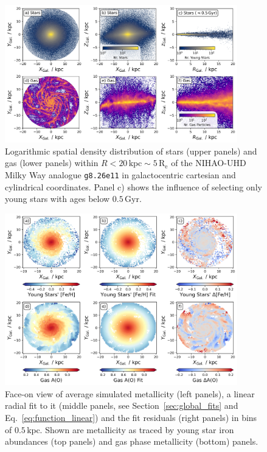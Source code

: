 \documentclass[twocolumn,apj,numberedappendix,appendixfloats,twocolappendix]{openjournal}
\newcommand{\nihaoAGEmax}{$0.5\,\mathrm{Gyr}$}
\begin{document}
\begin{CJK*}{UTF8}{gbsn}
\begin{figure}
    \centering
    \includegraphics[width=0.9\textwidth]{figures/stars_and_gas_overview.png}
    \caption{Logarithmic spatial density distribution of stars (upper panels) and gas (lower panels) within $R < 20\,\mathrm{kpc} \sim 5\,\mathrm{R_e}$ of the NIHAO-UHD Milky Way analogue \texttt{g8.26e11} in galactocentric cartesian and cylindrical coordinates. Panel c) shows the influence of selecting only young stars with ages below \nihaoAGEmax.}
    \label{fig:stars_and_gas_overview}
\end{figure}

\begin{figure}
    \centering
    \includegraphics[width=0.9\textwidth]{figures/stars_and_gas_2d_view.png}
    \caption{Face-on view of average simulated metallicity (left panels), a linear radial fit to it (middle panels, see Section~\ref{sec:global_fits} and Eq.~\ref{eq:function_linear}) and the fit residuals (right panels) in bins of $0.5\,\mathrm{kpc}$. Shown are metallicity as traced by young star iron abundances (top panels) and gas phase metallicity (bottom) panels.}
    \label{fig:stars_and_gas_2d_view}
\end{figure}


\end{CJK*}
\end{document}
